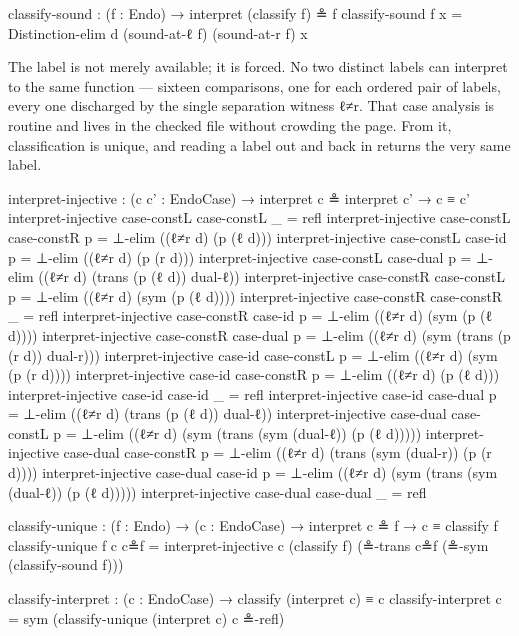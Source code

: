 \documentclass[11pt,a4paper]{book}
\def\texttt#1{#1}%
\begin{document}
\begin{code}
  classify-sound : (f : Endo) → interpret (classify f) ≗ f
  classify-sound f x = Distinction-elim d (sound-at-ℓ f) (sound-at-r f) x
\end{code}

The label is not merely available; it is forced. No two distinct labels
can interpret to the same function --- sixteen comparisons, one for each
ordered pair of labels, every one discharged by the single separation
witness \texttt{ℓ≠r}. That case analysis is routine and lives in the
checked file without crowding the page. From it, classification is
unique, and reading a label out and back in returns the very same label.

\begin{code}[hide]
  interpret-injective :
    (c c' : EndoCase) →
    interpret c ≗ interpret c' →
    c ≡ c'
  interpret-injective case-constL case-constL _ = refl
  interpret-injective case-constL case-constR p = ⊥-elim ((ℓ≠r d) (p (ℓ d)))
  interpret-injective case-constL case-id     p = ⊥-elim ((ℓ≠r d) (p (r d)))
  interpret-injective case-constL case-dual   p =
    ⊥-elim ((ℓ≠r d) (trans (p (ℓ d)) dual-ℓ))
  interpret-injective case-constR case-constL p =
    ⊥-elim ((ℓ≠r d) (sym (p (ℓ d))))
  interpret-injective case-constR case-constR _ = refl
  interpret-injective case-constR case-id     p =
    ⊥-elim ((ℓ≠r d) (sym (p (ℓ d))))
  interpret-injective case-constR case-dual   p =
    ⊥-elim ((ℓ≠r d) (sym (trans (p (r d)) dual-r)))
  interpret-injective case-id     case-constL p =
    ⊥-elim ((ℓ≠r d) (sym (p (r d))))
  interpret-injective case-id     case-constR p = ⊥-elim ((ℓ≠r d) (p (ℓ d)))
  interpret-injective case-id     case-id     _ = refl
  interpret-injective case-id     case-dual   p =
    ⊥-elim ((ℓ≠r d) (trans (p (ℓ d)) dual-ℓ))
  interpret-injective case-dual   case-constL p =
    ⊥-elim ((ℓ≠r d) (sym (trans (sym (dual-ℓ)) (p (ℓ d)))))
  interpret-injective case-dual   case-constR p =
    ⊥-elim ((ℓ≠r d) (trans (sym (dual-r)) (p (r d))))
  interpret-injective case-dual   case-id     p =
    ⊥-elim ((ℓ≠r d) (sym (trans (sym (dual-ℓ)) (p (ℓ d)))))
  interpret-injective case-dual   case-dual   _ = refl
\end{code}

\begin{code}
  classify-unique : (f : Endo) → (c : EndoCase) → interpret c ≗ f → c ≡ classify f
  classify-unique f c c≗f =
    interpret-injective c (classify f) (≗-trans c≗f (≗-sym (classify-sound f)))

  classify-interpret : (c : EndoCase) → classify (interpret c) ≡ c
  classify-interpret c = sym (classify-unique (interpret c) c ≗-refl)
\end{code}
\end{document}
